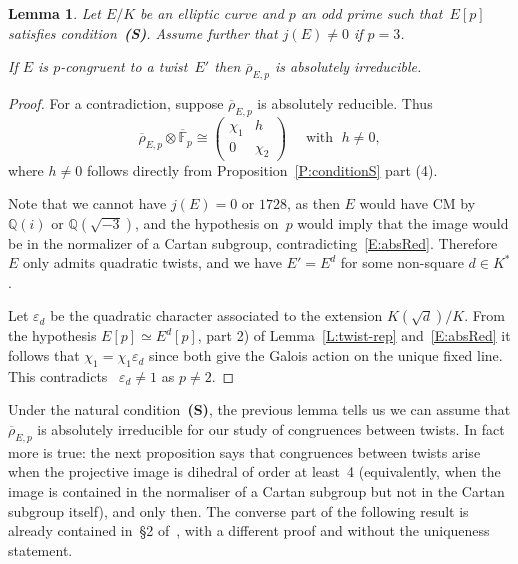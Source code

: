 \documentclass[twoside,leqno,symbols-for-thanks, draft]{rmi}
\numberwithin{equation}{section}
\newcommand{\condS}{condition~{\bf (S)}}
\newcommand{\F}{\mathbb{F}}
\newcommand{\Fbar}{{\overline{\F}}}
\newcommand{\Q}{\mathbb{Q}}
\newcommand{\rhobar}{{\overline{\rho}}}
\newcommand{\eps}{\varepsilon}
\newtheorem{lemma}[theorem]{Lemma}
\theoremstyle{remark}
\begin{document}
\begin{lemma} \label{L:noCyclic}
Let $E/K$ be an elliptic curve and $p$ an odd prime such that~$E[p]$
satisfies \condS. Assume further that $j(E) \neq 0$ if $p=3$.  

If $E$ is $p$-congruent to a
twist~$E'$ then $\rhobar_{E,p}$ is absolutely irreducible.
\end{lemma}
\begin{proof}
For a contradiction, suppose $\rhobar_{E,p}$ is absolutely reducible. Thus
\begin{equation} \label{E:absRed}
  \rhobar_{E,p} \otimes \Fbar_p \cong 
 \begin{pmatrix}
 \chi_1 & h \\ 0 &\chi_2
 \end{pmatrix} \quad \text{ with } \; h \neq 0, 
\end{equation} 
where $h \neq 0$ follows directly from
Proposition~\ref{P:conditionS} part (4).

Note that we cannot have $j(E) =0$ or $1728$, as then
$E$ would have CM by~$\Q(i)$ or $\Q(\sqrt{-3})$, and the hypothesis
on~$p$ would imply that the image would be in the normalizer of a
Cartan subgroup, contradicting~\eqref{E:absRed}. Therefore $E$ only admits
quadratic twists, and we have $E' = E^d$ for some non-square $d \in
K^*$.

Let $\eps_d$ be the quadratic character associated to the extension
$K(\sqrt{d})/K$. From the hypothesis $E[p] \simeq E^d[p]$, part 2) of
Lemma~\ref{L:twist-rep} and~\eqref{E:absRed} it follows that $\chi_1
=\chi_1\eps_d$ since both give the Galois action on the unique fixed
line. This contradicts ~$\eps_d \neq 1$ as $p \neq 2$.
\end{proof}


Under the natural \condS, the previous lemma tells us we can assume
that $\rhobar_{E,p}$ is absolutely irreducible for our study of
congruences between twists. In fact more is true: the next proposition
says that congruences between twists arise when the projective image
is dihedral of order at least~4 (equivalently, when the image is
contained in the normaliser of a Cartan subgroup but not in the Cartan
subgroup itself), and only then.  The converse part of the following
result is already contained in~\S2 of~\cite{Halberstadt-11nonsplit},
with a different proof and without the uniqueness statement.
\end{document}
